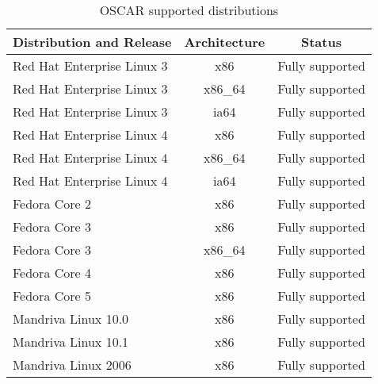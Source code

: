 %
%
%

\begin{table}[htbp]
  \begin{center}
    \begin{tabular}{|l|c|p{3in}|}
      \hline
      \multicolumn{1}{|c|}{Distribution and Release} &
      \multicolumn{1}{|c|}{Architecture} &
      \multicolumn{1}{|c|}{Status} \\
      \hline
      \hline
%
      Red Hat Enterprise Linux 3 & x86 & Fully supported \\
      Red Hat Enterprise Linux 3 & x86\_64 & Fully supported \\
      Red Hat Enterprise Linux 3 & ia64 & Fully supported \\
      Red Hat Enterprise Linux 4 & x86 & Fully supported \\
      Red Hat Enterprise Linux 4 & x86\_64 & Fully supported \\
      Red Hat Enterprise Linux 4 & ia64 & Fully supported \\
%
\hline
%
      Fedora Core 2 & x86 & Fully supported \\
      Fedora Core 3 & x86 & Fully supported \\
      Fedora Core 3 & x86\_64 & Fully supported \\
      Fedora Core 4 & x86 & Fully supported \\
      Fedora Core 5 & x86 & Fully supported \\
%
\hline
%
      Mandriva Linux 10.0 & x86 & Fully supported \\
      Mandriva Linux 10.1 & x86 & Fully supported \\
      Mandriva Linux 2006 & x86 & Fully supported \\
%
\hline
%
    \end{tabular}
    \caption{OSCAR supported distributions}
    \label{tab:oscar-distro-support}
  \end{center}
\end{table}
